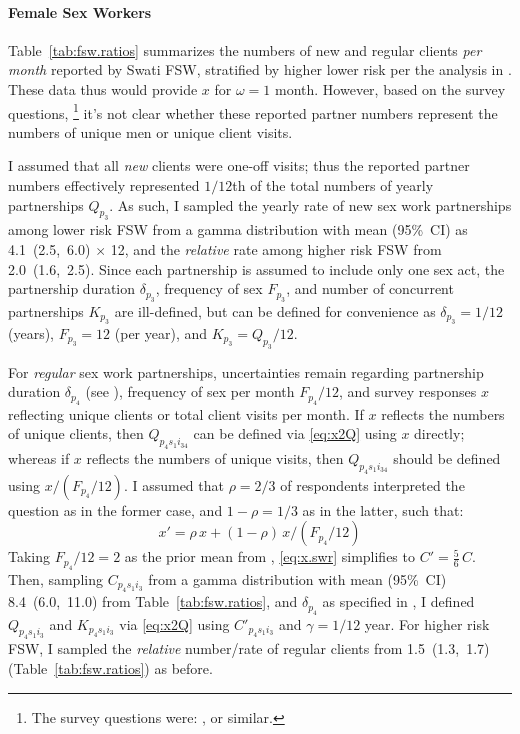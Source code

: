 \paragraph{Female Sex Workers}
Table~\ref{tab:fsw.ratios} summarizes
the numbers of new and regular clients \emph{per month} reported by Swati FSW,
stratified by higher \vs lower risk per the analysis in .
These data thus would provide $x$ for $\omega = 1$ month.
However, based on the survey questions,%
\footnote{The survey questions were: , or similar.}
it's not clear whether these reported partner numbers
represent the numbers of unique men or unique client visits.
\par
I assumed that all \emph{new} clients were one-off visits;
thus the reported partner numbers effectively represented
$1/12$th of the total numbers of yearly partnerships $Q_{p_{3}}$.
As such, I sampled the yearly rate of new sex work partnerships among lower risk FSW
from a gamma distribution with mean (95\%~CI) as 4.1~(2.5,~6.0) $\times$ 12,
and the \emph{relative} rate among higher risk FSW from 2.0~(1.6,~2.5).
Since each partnership is assumed to include only one sex act,
the partnership duration $\delta_{p_{3}}$, frequency of sex $F_{p_{3}}$,
and number of concurrent partnerships $K_{p_{3}}$ are ill-defined,
but can be defined for convenience as
$\delta_{p_{3}} = 1/12$ (years), $F_{p_{3}} = 12$ (per year),
and $K_{p_{3}} = Q_{p_{3}} / 12$.
\par
For \emph{regular} sex work partnerships, uncertainties remain regarding
partnership duration $\delta_{p_{4}}$ (see ),
frequency of sex per month $F_{p_{4}}/12$, and
survey responses $x$ reflecting unique clients or total client visits per month.
If $x$ reflects the numbers of unique clients, then
$Q_{p_{4}s_{1}i_{34}}$ can be defined via \eqref{eq:x2Q} using $x$ directly;
whereas if $x$ reflects the numbers of unique visits, then
$Q_{p_{4}s_{1}i_{34}}$ should be defined using $x/(F_{p_{4}}/12)$.
I assumed that $\rho = 2/3$ of respondents interpreted the question as in the former case,
and $1-\rho = 1/3$ as in the latter, such that:
\begin{equation}\label{eq:x.swr}
  x' = \rho\,x + (1-\rho)\,x/(F_{p_{4}}/12)
\end{equation}
Taking $F_{p_{4}}/12 = 2$ as the prior mean from ,
\eqref{eq:x.swr} simplifies to $C' = \frac{5}{6}\,C$.
Then, sampling $C_{p_{4}s_{1}i_{3}}$
from a gamma distribution with mean (95\%~CI) 8.4~(6.0,~11.0) from Table~\ref{tab:fsw.ratios},
and $\delta_{p_{4}}$ as specified in ,
I defined $Q_{p_{4}s_{1}i_{3}}$ and $K_{p_{4}s_{1}i_{3}}$
via \eqref{eq:x2Q} using $C'_{p_{4}s_{1}i_{3}}$ and $\gamma = 1/12$ year.
For higher risk FSW, I sampled the \emph{relative} number/rate of regular clients from
1.5~(1.3,~1.7) (Table~\ref{tab:fsw.ratios}) as before.

